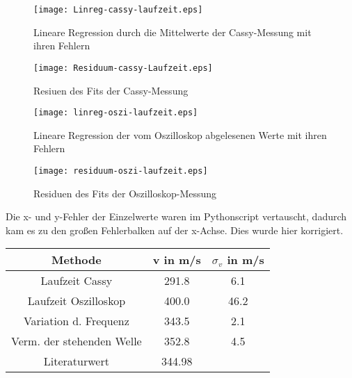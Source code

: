 \documentclass[12pt,a4paper]{article}
\author{Gruppe C14 \\ Julián Häck, Martin Koytek, Lars Wenning, Erik Zimmermann}
\begin{document}
\begin{figure}[H]
\centering
\texttt{[image: Linreg-cassy-laufzeit.eps]}
\caption{Lineare Regression durch die Mittelwerte der Cassy-Messung mit ihren Fehlern}
\end{figure}
\begin{figure}[H]
\centering
\texttt{[image: Residuum-cassy-Laufzeit.eps]}
\caption{Resiuen des Fits der Cassy-Messung}
\end{figure}
\begin{figure}[H]
\centering
\texttt{[image: linreg-oszi-laufzeit.eps]}
\caption{Lineare Regression der vom Oszilloskop abgelesenen Werte mit ihren Fehlern}
\end{figure}
\begin{figure}[H]
\centering
\texttt{[image: residuum-oszi-laufzeit.eps]}
\caption{Residuen des Fits der Oszilloskop-Messung}
\end{figure}
Die x- und y-Fehler der Einzelwerte waren im Pythonscript vertauscht, dadurch kam es zu den großen Fehlerbalken auf der x-Achse. Dies wurde hier korrigiert.
\centering
\begin{tabular}{|c|c|c|}
\hline 
Methode & v in m/s & $\sigma_v$ in m/s \\ 
\hline 
Laufzeit Cassy & 291.8 & 6.1 \\ 
\hline 
Laufzeit Oszilloskop & 400.0 & 46.2 \\ 
\hline 
Variation d. Frequenz & 343.5 & 2.1 \\ 
\hline 
Verm. der stehenden Welle & 352.8 & 4.5 \\ 
\hline 
Literaturwert & 344.98 &  \\ 
\hline 
\end{tabular} 
\end{document}
